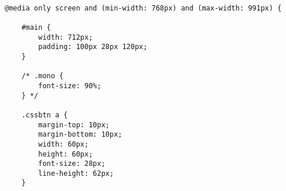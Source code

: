 \documentclass{scrreprt}
\begin{document}
\begin{lstlisting}[style=htmlcssjs]

@media only screen and (min-width: 768px) and (max-width: 991px) {
	
	#main {
		width: 712px;
		padding: 100px 28px 120px;
	}
	
	/* .mono {
		font-size: 90%;
	} */
	
	.cssbtn a {
		margin-top: 10px;
		margin-bottom: 10px;
		width: 60px;  
		height: 60px;   
		font-size: 28px;
		line-height: 62px;
	}
\end{lstlisting} 
\end{document}

